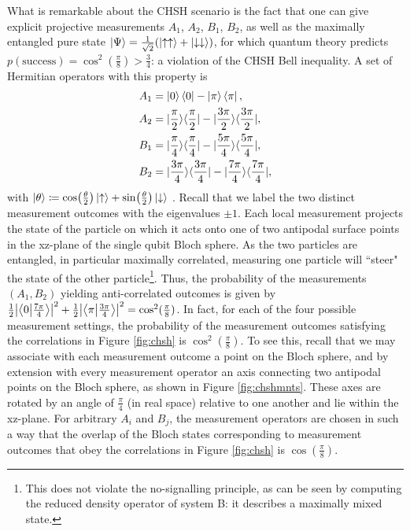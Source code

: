 What is remarkable about the CHSH scenario is the fact that one can give explicit projective measurements $A_{1}$, $A_{2}$, $B_{1}$, $B_{2}$, as well as the maximally entangled pure state $\ket{\Psi} =\frac{1}{\sqrt{2}}(\ket{\uparrow\uparrow} +\ket{\downarrow\downarrow})$, for which quantum theory predicts $p(\text{{success}})=\cos^{2}(\frac{\pi}{8})>\frac{3}{4}$: a violation of the CHSH Bell inequality. A set of Hermitian operators with this property is 
\begin{equation}
\label{eqn:chshmnts}
\begin{split}
A_{1} & =\ket{0}\bra{0}-\ket{\pi}\bra{\pi},\\
A_{2} & =|\frac{\pi}{2}\rangle\langle\frac{\pi}{2}|-|\frac{3\pi}{2}\rangle\langle\frac{3\pi}{2}|,\\
B_{1} & =|\frac{\pi}{4}\rangle\langle\frac{\pi}{4}|-|\frac{5\pi}{4}\rangle\langle\frac{5\pi}{4}|,\\
B_{2} & =|\frac{3\pi}{4}\rangle\langle\frac{3\pi}{4}|-|\frac{7\pi}{4}\rangle\langle\frac{7\pi}{4}|,
\end{split}
\end{equation}
with $\ket{\theta} \coloneqq\cos(\frac{\theta}{2})\ket{\uparrow} +\sin(\frac{\theta}{2})\ket{\downarrow}$ \cite{Colbeck2019}. Recall that we label the two distinct measurement outcomes with the eigenvalues $\pm 1$. Each local measurement projects the state of the particle on which it acts onto one of two antipodal surface points in the xz-plane of the single qubit Bloch sphere. As the two particles are entangled, in particular maximally correlated, measuring one particle will ``steer" the state of the other particle\footnote{This does not violate the no-signalling principle, as can be seen by computing the reduced density operator of system B: it describes a maximally mixed state.}. Thus, the probability of the measurements $(A_1,B_2)$ yielding anti-correlated outcomes is given by $\frac{1}{2}\abs{\bra{0}\ket{\frac{7\pi}{4}}}^2+\frac{1}{2}\abs{\bra{\pi}\ket{\frac{3\pi}{4}}}^2=\cos^2(\frac{\pi}{8})$. In fact, for each of the four possible measurement settings, the probability of the measurement outcomes satisfying the correlations in Figure \ref{fig:chsh} is $\cos^2(\frac{\pi}{8})$. To see this, recall that we may associate with each measurement outcome a point on the Bloch sphere, and by extension with every measurement operator an axis connecting two antipodal points on the Bloch sphere, as shown in Figure \ref{fig:chshmnts}. These axes are rotated by an angle of $\frac{\pi}{4}$ (in real space) relative to one another and lie within the xz-plane. For arbitrary $A_i$ and $B_j$, the measurement operators are chosen in such a way that the overlap of the Bloch states corresponding to measurement outcomes that obey the correlations in Figure \ref{fig:chsh} is $\cos(\frac{\pi}{8})$.

